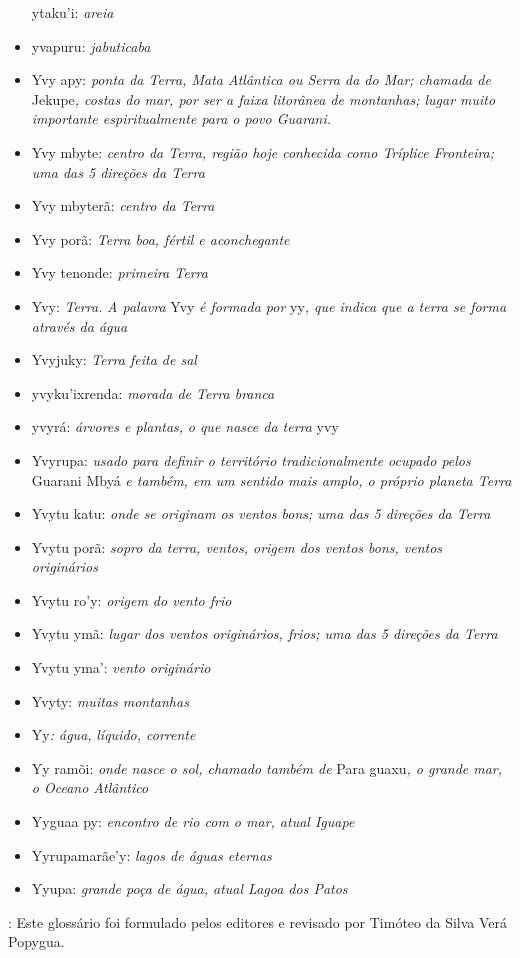 \begin{itemize}
  ytaku'i: \emph{areia}
\item
  yvapuru: \emph{jabuticaba}
\item
  Yvy apy: \emph{ponta da Terra, Mata Atlântica ou Serra da do Mar;
  chamada de} Jekupe\emph{, costas do mar, por ser a faixa litorânea de
  montanhas; lugar muito importante espiritualmente para o povo
  Guarani.} 
\item
  Yvy mbyte: \emph{centro da Terra, região hoje conhecida como Tríplice
  Fronteira; uma das 5 direções da Terra}
\item
  Yvy mbyterã: \emph{centro da Terra}
\item
  Yvy porã: \emph{Terra boa, fértil e aconchegante}
\item
  Yvy tenonde: \emph{primeira Terra}
\item
  Yvy: \emph{Terra.} \emph{A palavra} Yvy \emph{é formada por} yy\emph{,
  que indica que a terra se forma através da água}
\item
  Yvyjuky: \emph{Terra feita de sal}
\item
  yvyku'ixrenda: \emph{morada de Terra branca}
\item
  yvyrá: \emph{árvores e plantas,} \emph{o que nasce da terra} yvy
\item
  Yvyrupa: \emph{usado para definir o território tradicionalmente
  ocupado pelos} Guarani Mbyá \emph{e também, em um sentido mais amplo,
  o próprio planeta Terra}
\item
  Yvytu katu: \emph{onde se originam os ventos bons; uma das 5 direções
  da Terra}
\item
  Yvytu porã: \emph{sopro da terra, ventos, origem dos ventos bons,
  ventos originários}
\item
  Yvytu ro'y: \emph{origem do vento frio}
\item
  Yvytu ymã: \emph{lugar dos ventos originários, frios; uma das 5
  direções da Terra}
\item
  Yvytu yma': \emph{vento originário}
\item
  Yvyty: \emph{muitas montanhas}
\item
  Yy\emph{: água,} \emph{líquido, corrente}
\item
  Yy ramõi: \emph{onde nasce o sol, chamado também de} Para guaxu\emph{,
  o grande mar, o Oceano Atlântico}
\item
  Yyguaa py: \emph{encontro de rio com o mar, atual Iguape}
\item
  Yyrupamarãe'y: \emph{lagos de águas eternas}
\item
  Yyupa: \emph{grande poça de água, atual Lagoa dos Patos}
\end{itemize}

\emph{​}: Este glossário foi formulado pelos editores e revisado por
Timóteo da Silva Verá Popygua.
